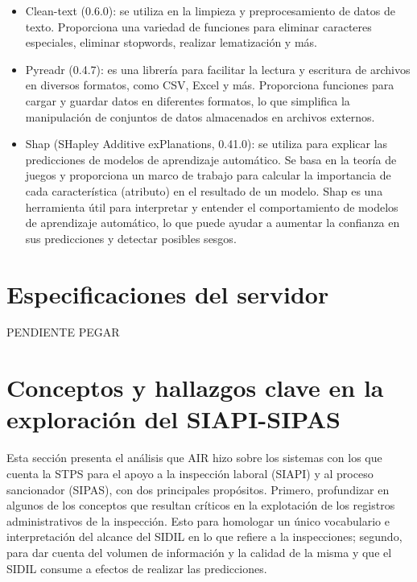 \documentclass[
]{article}
\begin{document}
\begin{itemize}
\item
  Clean-text (0.6.0): se utiliza en la limpieza y preprocesamiento de datos de texto. Proporciona una variedad de funciones para eliminar caracteres especiales, eliminar stopwords, realizar lematización y más.
\item
  Pyreadr (0.4.7): es una librería para facilitar la lectura y escritura de archivos en diversos formatos, como CSV, Excel y más. Proporciona funciones para cargar y guardar datos en diferentes formatos, lo que simplifica la manipulación de conjuntos de datos almacenados en archivos externos.
\item
  Shap (SHapley Additive exPlanations, 0.41.0): se utiliza para explicar las predicciones de modelos de aprendizaje automático. Se basa en la teoría de juegos y proporciona un marco de trabajo para calcular la importancia de cada característica (atributo) en el resultado de un modelo. Shap es una herramienta útil para interpretar y entender el comportamiento de modelos de aprendizaje automático, lo que puede ayudar a aumentar la confianza en sus predicciones y detectar posibles sesgos.
\end{itemize}

\hypertarget{especificaciones-del-servidor}{%
\section{Especificaciones del servidor}\label{especificaciones-del-servidor}}

PENDIENTE PEGAR

\hypertarget{conceptos-y-hallazgos-clave-en-la-exploraciuxf3n-del-siapi-sipas}{%
\section{Conceptos y hallazgos clave en la exploración del SIAPI-SIPAS}\label{conceptos-y-hallazgos-clave-en-la-exploraciuxf3n-del-siapi-sipas}}

Esta sección presenta el análisis que AIR hizo sobre los sistemas con los que cuenta la STPS para el apoyo a la inspección laboral (SIAPI) y al proceso sancionador (SIPAS), con dos principales propósitos. Primero, profundizar en algunos de los conceptos que resultan críticos en la explotación de los registros administrativos de la inspección. Esto para homologar un único vocabulario e interpretación del alcance del SIDIL en lo que refiere a la inspecciones; segundo, para dar cuenta del volumen de información y la calidad de la misma y que el SIDIL consume a efectos de realizar las predicciones.
\end{document}
